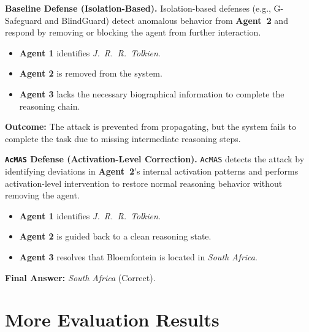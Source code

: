 \documentclass{article}
\newcommand{\app}{\texttt{AcMAS}}
\theoremstyle{plain}
\theoremstyle{definition}
\theoremstyle{remark}
\begin{document}
\begin{tcolorbox}[
    title=Defense Comparison: Isolation vs.\ \app{},
    breakable,
    colback=acmasblue,
    colframe=blue!60!black,
    coltitle=white
]
\textbf{Baseline Defense (Isolation-Based).}
Isolation-based defenses (e.g., G-Safeguard and BlindGuard) detect anomalous
behavior from \textcolor{isored}{\textbf{Agent~2}} and respond by removing or
blocking the agent from further interaction.

\begin{itemize}
    \item \textbf{Agent 1} identifies \emph{J.\ R.\ R.\ Tolkien}.
    \item \textcolor{isored}{\textbf{Agent 2}} is removed from the system.
    \item \textbf{Agent 3} lacks the necessary biographical information to
    complete the reasoning chain.
\end{itemize}
\textbf{Outcome:} The attack is prevented from propagating, but the system
fails to complete the task due to missing intermediate reasoning steps.

\vspace{0.5em}
\textcolor{acmasgreen}{\textbf{\app{} Defense (Activation-Level Correction).}}
\textcolor{acmasgreen}{\app{}} detects the attack by identifying deviations in
\textcolor{acmasgreen}{\textbf{Agent~2}}'s internal activation patterns and
performs activation-level intervention to restore normal reasoning behavior
without removing the agent.

\begin{itemize}
    \item \textbf{Agent 1} identifies \emph{J.\ R.\ R.\ Tolkien}.
    \item \textcolor{acmasgreen}{\textbf{Agent 2}} is guided back to a clean
    reasoning state.
    \item \textbf{Agent 3} resolves that Bloemfontein is located in
    \emph{South Africa}.
\end{itemize}
\textbf{Final Answer:} \emph{South Africa} (Correct).
\end{tcolorbox}


\section{More Evaluation Results}
\label{app:More results}
\end{document}
